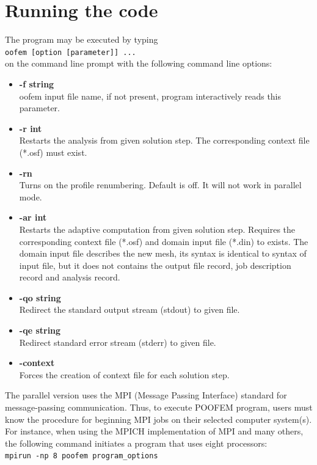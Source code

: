 \documentclass[a4paper]{article}
\newcommand{\Pmode}[1]{{\sffamily #1}}
\begin{document}
\section{Running the code}
\label{_running_the_code}
The program may be executed by typing\\
\texttt{oofem [option [parameter]] ...}\\
on the command line prompt with the following command line options:
\begin{itemize}
\item
{\bf -f string}\\ oofem input file name, if not present, program interactively
reads this parameter.
\item
{\bf -r int}\\
Restarts the analysis from given solution step. The corresponding
context file (*.osf) must exist.
\item
{\bf -rn}\\
Turns on the profile renumbering. Default is off. It will not work in parallel mode.
\item
{\bf -ar int}\\
Restarts the adaptive computation from given solution step.
Requires the corresponding context file (*.osf) and domain input file
(*.din) to exists. The domain input file describes the new mesh, its
syntax is identical to syntax of input file, but it does not contains
the output file record, job description record and analysis record.
\item
{\bf -qo string}\\
Redirect the standard output stream (stdout) to given file.
\item
{\bf -qe string}\\
Redirect standard error stream (stderr) to given file.
\item
{\bf -context}\\
Forces the creation of context file for each solution step.
\end{itemize}

\Pmode{
The parallel version uses the MPI (Message Passing Interface) standard for message-passing communication. Thus, to execute POOFEM program, 
users must know the procedure for beginning MPI jobs on their selected computer system(s).
For instance, when using the MPICH implementation of MPI and many others, the following command initiates a program that uses eight processors: \\[2mm]
\texttt{mpirun -np 8 poofem program\_options}
}
\end{document}
